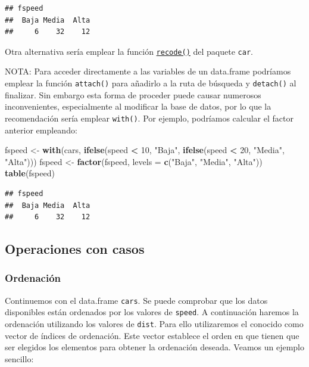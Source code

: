 \documentclass[]{book}
\newenvironment{Shaded}{\begin{snugshade}}{\end{snugshade}}
\newcommand{\KeywordTok}[1]{\textcolor[rgb]{0.13,0.29,0.53}{\textbf{#1}}}
\newcommand{\DataTypeTok}[1]{\textcolor[rgb]{0.13,0.29,0.53}{#1}}
\newcommand{\DecValTok}[1]{\textcolor[rgb]{0.00,0.00,0.81}{#1}}
\newcommand{\StringTok}[1]{\textcolor[rgb]{0.31,0.60,0.02}{#1}}
\newcommand{\OperatorTok}[1]{\textcolor[rgb]{0.81,0.36,0.00}{\textbf{#1}}}
\newcommand{\NormalTok}[1]{#1}
\begin{document}
\begin{verbatim}
## fspeed
##  Baja Media  Alta 
##     6    32    12
\end{verbatim}

Otra alternativa sería emplear la función
\href{https://www.rdocumentation.org/packages/car/versions/3.0-9/topics/recode}{\texttt{recode()}}
del paquete \texttt{car}.

NOTA: Para acceder directamente a las variables de un data.frame
podríamos emplear la función \texttt{attach()} para añadirlo a la ruta
de búsqueda y \texttt{detach()} al finalizar. Sin embargo esta forma de
proceder puede causar numerosos inconvenientes, especialmente al
modificar la base de datos, por lo que la recomendación sería emplear
\texttt{with()}. Por ejemplo, podríamos calcular el factor anterior
empleando:

\begin{Shaded}
\begin{Highlighting}[]
\NormalTok{fspeed <-}\StringTok{ }\KeywordTok{with}\NormalTok{(cars, }\KeywordTok{ifelse}\NormalTok{(speed }\OperatorTok{<}\StringTok{ }\DecValTok{10}\NormalTok{, }\StringTok{"Baja"}\NormalTok{,}
                 \KeywordTok{ifelse}\NormalTok{(speed }\OperatorTok{<}\StringTok{ }\DecValTok{20}\NormalTok{, }\StringTok{"Media"}\NormalTok{, }\StringTok{"Alta"}\NormalTok{)))}
\NormalTok{fspeed <-}\StringTok{ }\KeywordTok{factor}\NormalTok{(fspeed, }\DataTypeTok{levels =} \KeywordTok{c}\NormalTok{(}\StringTok{"Baja"}\NormalTok{, }\StringTok{"Media"}\NormalTok{, }\StringTok{"Alta"}\NormalTok{))}
\KeywordTok{table}\NormalTok{(fspeed)}
\end{Highlighting}
\end{Shaded}

\begin{verbatim}
## fspeed
##  Baja Media  Alta 
##     6    32    12
\end{verbatim}

\subsection{Operaciones con casos}\label{operaciones-con-casos}

\subsubsection{Ordenación}\label{ordenaciuxf3n}

Continuemos con el data.frame \texttt{cars}. Se puede comprobar que los
datos disponibles están ordenados por los valores de \texttt{speed}. A
continuación haremos la ordenación utilizando los valores de
\texttt{dist}. Para ello utilizaremos el conocido como vector de índices
de ordenación. Este vector establece el orden en que tienen que ser
elegidos los elementos para obtener la ordenación deseada. Veamos un
ejemplo sencillo:
\end{document}

